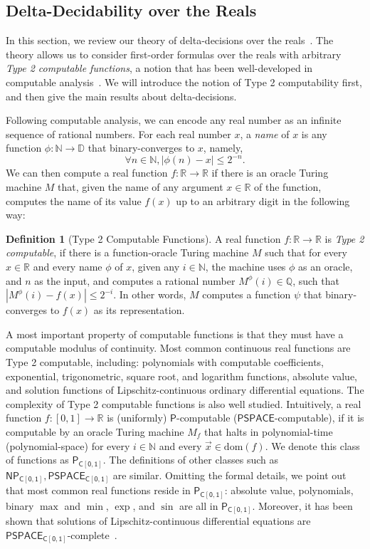 \documentclass[10pt]{article}
\theoremstyle{definition}
\newtheorem{definition}{Definition}[section]
\newcommand{\N}{\mathbb{N}}
\newcommand{\dom}{\mathrm{dom}}
\newcommand{\R}{\mathbb{R}}
\begin{document}
\subsection{Delta-Decidability over the Reals}\label{delta-decide}

In this section, we review our theory of delta-decisions over the reals~\cite{DBLP:conf/lics/GaoAC12}. The theory allows us to consider first-order formulas over the reals with arbitrary {\em Type 2 computable functions}, a notion that has been well-developed in computable analysis~\cite{CAbook,Kobook}. We will introduce the notion of Type 2 computability first, and then give the main results about delta-decisions. 

Following computable analysis, we can encode any real number as an infinite sequence of rational numbers. For each real number $x$, a {\em name} of $x$ is any function $\phi: \N\rightarrow \mathbb{D}$ that {binary-converges} to $x$, namely, 
$$\forall n\in \N, |\phi(n) - x|\leq 2^{-n}.$$
We can then compute a real function $f:\mathbb{R}\rightarrow\mathbb{R}$ if there is an oracle Turing machine $M$ that, given the name of any argument $x\in\mathbb{R}$ of the function, computes the name of its value $f(x)$ up to an arbitrary digit in the following way:
\begin{definition}[Type 2 Computable Functions]
A real function $f: \R\rightarrow \R$
is {\em Type 2 computable}, if there is a function-oracle Turing machine $M$ such that for every $x\in \mathbb{R}$ and every name $\phi$ of $x$, given any $i\in\mathbb{N}$, the machine uses $\phi$ as an oracle, and $n$ as the input, and computes a rational number $M^{\phi}(i)\in\mathbb{Q}$, such that $|M^{\phi}(i)-f(x)|\leq 2^{-i}$. In other words, $M$ computes a function $\psi$ that binary-converges to $f(x)$ as its representation. 
\end{definition}
A most important property of computable functions is that they must have a computable modulus of continuity. Most common continuous real functions are Type 2 computable, including: polynomials with computable coefficients, exponential, trigonometric, square root, and logarithm functions, absolute value, and solution functions of Lipschitz-continuous ordinary differential equations. The complexity of Type 2 computable functions is also well studied. Intuitively, a real function $f:[0,1]\rightarrow\mathbb{R}$ is (uniformly) $\mathsf{P}$-computable ($\mathsf{PSPACE}$-computable), if it is computable by an oracle Turing machine $M_{f}$ that halts in polynomial-time (polynomial-space) for every $i\in \mathbb{N}$ and every $\vec x\in \dom(f)$. We denote this class of functions as $\mathsf{P_{C[0,1]}}$. The definitions of other classes such as $\mathsf{NP_{C[0,1]}}, \mathsf{PSPACE_{C[0,1]}}$ are similar. Omitting the formal details, we point out that most common real functions reside in $\mathsf{P_{C[0,1]}}$: absolute value, polynomials, binary $\max$ and $\min$, $\exp$, and $\sin$ are all in $\mathsf{P_{C[0,1]}}$. Moreover, it has been shown that solutions of Lipschitz-continuous differential equations are $\mathsf{PSPACE_{C[0,1]}}$-complete~\cite{DBLP:journals/cc/Kawamura10,Kobook}.
\end{document}
